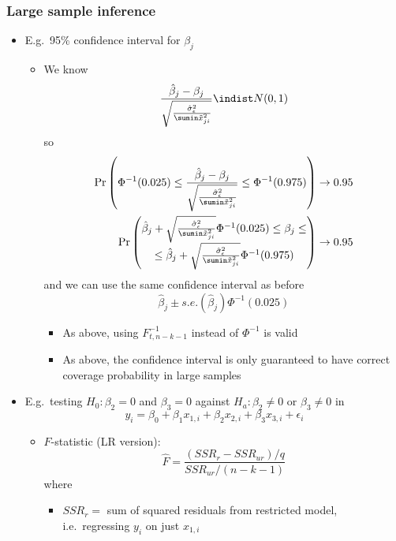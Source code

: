 \begin{frame}[allowframebreaks]\frametitle{Large sample inference}
  \begin{itemize}
  \item E.g.\ 95\% confidence interval for $\beta_j$
    \begin{itemize}
    \item We know 
      \[ \frac{\hat{\beta}_j - \beta_j}
      {\sqrt{\frac{\hat{\sigma}^2_\epsilon}{\sumin \tilde{x}_{ji}^2}}} 
      \indist N(0,1) \]
      so
      \begin{align*}
        \Pr \left( \Phi^{-1}(0.025) \leq \frac{\hat{\beta}_j - \beta_j}
          {\sqrt{\frac{\hat{\sigma}^2_\epsilon}{\sumin \tilde{x}_{ji}^2}}}
          \leq \Phi^{-1}(0.975) \right) & \to 0.95 \\
        \Pr \begin{pmatrix} \hat{\beta}_j + \sqrt{\frac{\hat{\sigma}^2_\epsilon}{\sumin
              \tilde{x}_{ji}^2}} \Phi^{-1}(0.025) \leq \beta_j \leq \\
          \leq \hat{\beta}_j + \sqrt{\frac{\hat{\sigma}^2_\epsilon}{\sumin
              \tilde{x}_{ji}^2}} \Phi^{-1}(0.975)
        \end{pmatrix}
        & \to 0.95 
      \end{align*}
      and we can use the same confidence interval as before
      \[ \hat{\beta}_j \pm s.e.(\hat{\beta}_j) \Phi^{-1}(0.025) \]
      \begin{itemize}
      \item As above, using $F_{t,n-k-1}^{-1}$ instead of $\Phi^{-1}$
        is valid
      \item As above, the confidence interval is only guaranteed to
        have correct coverage probability in large samples
      \end{itemize}
    \end{itemize}
  \item E.g.\ testing $H_0: \beta_2 = 0$ and $\beta_3 = 0$ against
    $H_a: \beta_2 \neq 0$ or $\beta_3 \neq 0$ in 
    \[ y_i = \beta_0 + \beta_1 x_{1,i} + \beta_2 x_{2,i} + \beta_3
    x_{3,i} + \epsilon_i \]
    \begin{itemize}
    \item $F$-statistic (LR version):
      \[ \hat{F} = \frac{(SSR_r - SSR_{ur})/q}{SSR_{ur}/(n-k-1)} \]
      where
      \begin{itemize}
      \item $SSR_r= $ sum of squared residuals from restricted model,
        i.e.\ regressing $y_i$ on just $x_{1,i}$

\end{itemize}
\end{itemize}
\end{itemize}
\end{frame}
